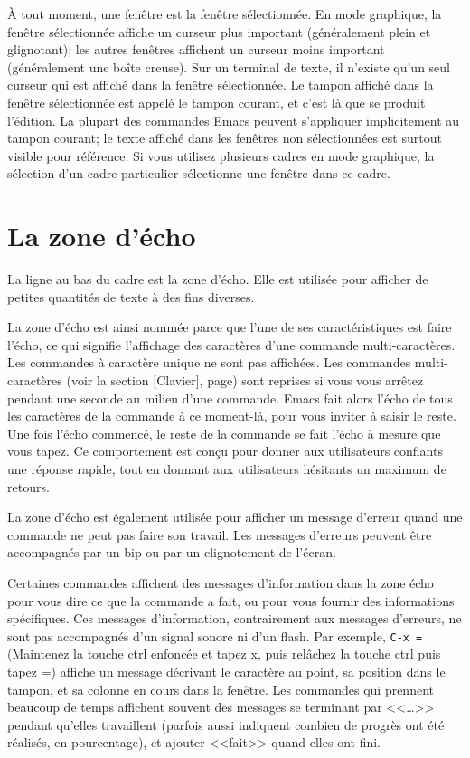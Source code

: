\`A tout moment, une fenêtre est la fenêtre sélectionnée. En mode
graphique, la fenêtre sélectionnée affiche un curseur plus important
(généralement plein et glignotant); les autres fenêtres affichent un
curseur moins important (généralement une boîte creuse). Sur un
terminal de texte, il n'existe qu'un seul curseur qui est affiché dans
la fenêtre sélectionnée. Le tampon affiché dans la fenêtre
sélectionnée est appelé le tampon courant, et c'est là que se produit
l'édition. La plupart des commandes Emacs peuvent s'appliquer
implicitement au tampon courant; le texte affiché dans les fenêtres
non sélectionnées est surtout visible pour référence. Si vous utilisez
plusieurs cadres en mode graphique, la sélection d'un cadre
particulier sélectionne une fenêtre dans ce cadre.\par




\section{La zone d'écho}
La ligne au bas du cadre est la zone d'écho. Elle est utilisée pour
afficher de petites quantités de texte à des fins diverses.\par

La zone d'écho est ainsi nommée parce que l'une de ses
caractéristiques est faire l'écho, ce qui signifie l'affichage des
caractères d'une commande multi-caractères. Les commandes à caractère
unique ne sont pas affichées. Les commandes multi-caractères (voir la
section [Clavier], page) sont
reprises si vous vous arrêtez pendant une seconde au milieu d'une
commande. Emacs fait alors l'écho de tous les caractères de la commande
à ce moment-là, pour vous inviter à saisir le reste. Une fois l'écho
commencé, le reste de la commande se fait l'écho à mesure que vous
tapez. Ce comportement est conçu pour donner aux utilisateurs
confiants une réponse rapide, tout en donnant aux utilisateurs
hésitants un maximum de retours. \par

La zone d'écho est également utilisée pour afficher un message
d'erreur quand une commande ne peut pas faire son travail. Les
messages d'erreurs peuvent être accompagnés par un bip ou par un
clignotement de l'écran. \par 

Certaines commandes affichent des messages d'information dans la zone
écho pour vous dire ce que la commande a fait, ou pour vous
fournir des informations spécifiques. Ces messages d'information,
contrairement aux messages d'erreurs, ne sont pas accompagnés d'un
signal sonore ni d'un flash. Par exemple, \texttt{C-x =} (Maintenez la
touche ctrl enfoncée et tapez x, puis relâchez la touche ctrl puis
tapez =) affiche un message décrivant le caractère au point, sa
position dans le tampon, et sa colonne en cours dans la fenêtre. Les
commandes qui prennent beaucoup de temps affichent souvent des
messages se terminant par <<\dots{}>> pendant qu'elles travaillent
(parfois aussi indiquent combien de progrès ont été réalisés, en
pourcentage), et ajouter <<fait>> quand elles ont fini.\par 

